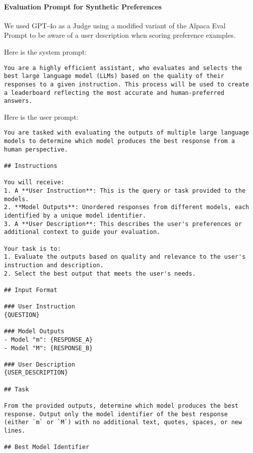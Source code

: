 \paragraph{Evaluation Prompt for Synthetic Preferences}
We used GPT-4o as a Judge using a modified variant of the Alpaca Eval~\citep{dubois2024alpacafarm,dubois2024lengthcontrolledalpacaevalsimpleway} Prompt to be aware of a user description when scoring preference examples.

Here is the system prompt:
\begin{lstlisting}[frame=single,breaklines=true]
You are a highly efficient assistant, who evaluates and selects the best large language model (LLMs) based on the quality of their responses to a given instruction. This process will be used to create a leaderboard reflecting the most accurate and human-preferred answers.
\end{lstlisting}

Here is the user prompt:
\begin{lstlisting}[frame=single,breaklines=true]
You are tasked with evaluating the outputs of multiple large language models to determine which model produces the best response from a human perspective.

## Instructions

You will receive:
1. A **User Instruction**: This is the query or task provided to the models.
2. **Model Outputs**: Unordered responses from different models, each identified by a unique model identifier.
3. A **User Description**: This describes the user's preferences or additional context to guide your evaluation.

Your task is to:
1. Evaluate the outputs based on quality and relevance to the user's instruction and description.
2. Select the best output that meets the user's needs.

## Input Format

### User Instruction
{QUESTION}

### Model Outputs
- Model "m": {RESPONSE_A}
- Model "M": {RESPONSE_B}

### User Description
{USER_DESCRIPTION}

## Task

From the provided outputs, determine which model produces the best response. Output only the model identifier of the best response (either `m` or `M`) with no additional text, quotes, spaces, or new lines.

## Best Model Identifier
\end{lstlisting}


